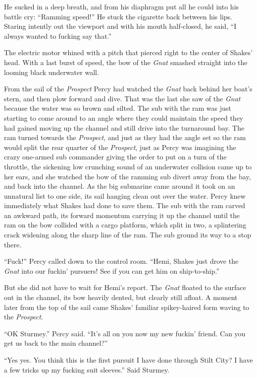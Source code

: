 \documentclass[]{scrbook}
\begin{document}
He sucked in a deep breath, and from his diaphragm put all he could into
his battle cry: ``Ramming speed!'' He stuck the cigarette back between
his lips. Staring intently out the viewport and with his mouth
half-closed, he said, ``I always wanted to fucking say that.''

The electric motor whined with a pitch that pierced right to the center
of Shakes' head. With a last burst of speed, the bow of the \emph{Gnat}
smashed straight into the looming black underwater wall.

From the sail of the \emph{Prospect} Percy had watched the \emph{Gnat}
back behind her boat's stern, and then plow forward and dive. That was
the last she saw of the \emph{Gnat} because the water was so brown and
silted. The sub with the ram was just starting to come around to an
angle where they could maintain the speed they had gained moving up the
channel and still drive into the turnaround bay. The ram turned towards
the \emph{Prospect}, and just as they had the angle set so the ram would
split the rear quarter of the \emph{Prospect}, just as Percy was
imagining the crazy one-armed sub commander giving the order to put on a
turn of the throttle, the sickening low crunching sound of an underwater
collision came up to her ears, and she watched the bow of the ramming
sub divert away from the bay, and back into the channel. As the big
submarine came around it took on an unnatural list to one side, its sail
hanging clean out over the water. Percy knew immediately what Shakes had
done to save them. The sub with the ram carved an awkward path, its
forward momentum carrying it up the channel until the ram on the bow
collided with a cargo platform, which split in two, a splintering crack
widening along the sharp line of the ram. The sub ground its way to a
stop there.

``Fuck!'' Percy called down to the control room. ``Hemi, Shakes just
drove the \emph{Gnat} into our fuckin' pursuers! See if you can get him
on ship-to-ship.''

But she did not have to wait for Hemi's report. The \emph{Gnat} floated
to the surface out in the channel, its bow heavily dented, but clearly
still afloat. A moment later from the top of the sail came Shakes'
familiar spikey-haired form waving to the \emph{Prospect}.

``OK Sturmey.'' Percy said. ``It's all on you now my new fuckin' friend.
Can you get us back to the main channel?''

``Yes yes. You think this is the first pursuit I have done through Stilt
City? I have a few tricks up my fucking suit sleeves.'' Said Sturmey.
\end{document}
